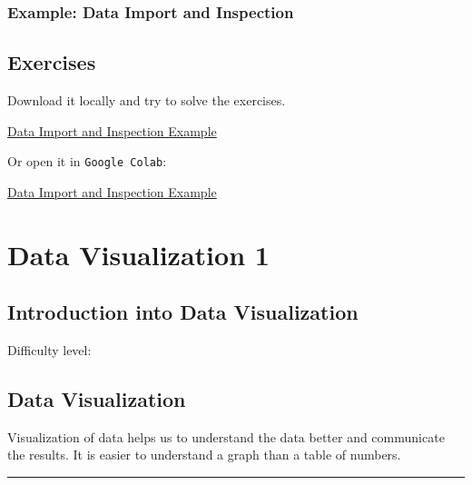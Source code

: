 \documentclass[
  letterpaper,
  DIV=11,
  numbers=noendperiod]{scrreprt}
\begin{document}
\section*{Example: Data Import and
Inspection}\label{example-data-import-and-inspection}


\chapter*{Exercises}\label{exercises-1}


Download it locally and try to solve the exercises.

\href{https://github.com/stkroe/PythonforChemists/blob/main/course/examples/DHP_Example.ipynb}{Data
Import and Inspection Example}

Or open it in \texttt{Google\ Colab}:

\href{https://colab.research.google.com/github/stkroe/PythonforChemists/blob/main/course/examples/DHP_Example.ipynb}{Data
Import and Inspection Example}

\part{Data Visualization 1}

\chapter{Introduction into Data
Visualization}\label{introduction-into-data-visualization}

Difficulty level: { }

\chapter*{Data Visualization}\label{data-visualization}


Visualization of data helps us to understand the data better and
communicate the results. It is easier to understand a graph than a table
of numbers.

\begin{center}\rule{0.5\linewidth}{0.5pt}\end{center}
\end{document}
